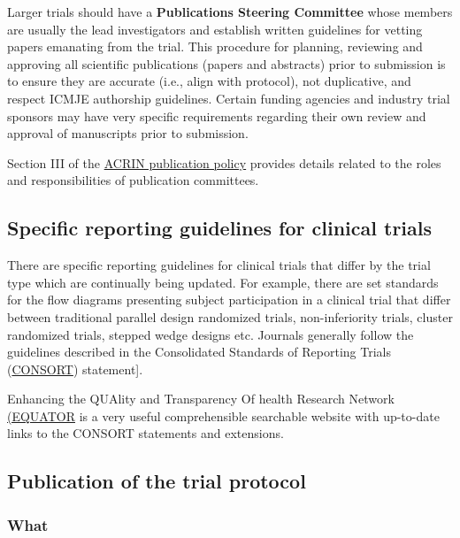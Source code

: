 \documentclass[]{book}
\theoremstyle{definition}
\theoremstyle{definition}
\theoremstyle{definition}
\theoremstyle{remark}
\begin{document}
Larger trials should have a \textbf{Publications Steering Committee}
whose members are usually the lead investigators and establish written
guidelines for vetting papers emanating from the trial. This procedure
for planning, reviewing and approving all scientific publications
(papers and abstracts) prior to submission is to ensure they are
accurate (i.e., align with protocol), not duplicative, and respect ICMJE
authorship guidelines. Certain funding agencies and industry trial
sponsors may have very specific requirements regarding their own review
and approval of manuscripts prior to submission.

Section III of the
\protect\hyperlink{https:ux2fux2fwww.acrin.orgux2fRESEARCHERSux2fPOLICIESux2fPUBLICATIONSPOLICYux2fPUBLICATIONSPOLICYDOCUMENT.aspx}{ACRIN
publication policy} provides details related to the roles and
responsibilities of publication committees.

\subsection{Specific reporting guidelines for clinical
trials}\label{specific-reporting-guidelines-for-clinical-trials}

There are specific reporting guidelines for clinical trials that differ
by the trial type which are continually being updated. For example,
there are set standards for the flow diagrams presenting subject
participation in a clinical trial that differ between traditional
parallel design randomized trials, non-inferiority trials, cluster
randomized trials, stepped wedge designs etc. Journals generally follow
the guidelines described in the Consolidated Standards of Reporting
Trials (\href{http://www.consort-statement.org/}{CONSORT}) statement{]}.

Enhancing the QUAlity and Transparency Of health Research Network
\href{http://www.equator-network.org/}{(EQUATOR} is a very useful
comprehensible searchable website with up-to-date links to the CONSORT
statements and extensions.

\subsection{Publication of the trial
protocol}\label{publication-of-the-trial-protocol}

\subsubsection{What}\label{what-22}
\end{document}
